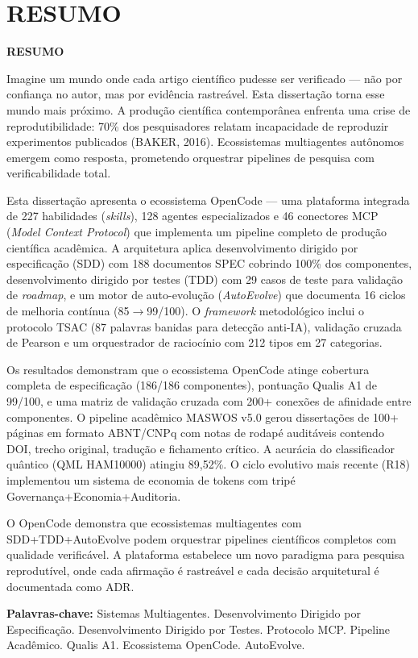\chapter*{RESUMO}
\thispagestyle{empty}

\begin{center}
  {\Large\bfseries RESUMO\par}
\end{center}
\vspace{1cm}

Imagine um mundo onde cada artigo científico pudesse ser verificado — não por confiança no autor, mas por evidência rastreável. Esta dissertação torna esse mundo mais próximo. A produção científica contemporânea enfrenta uma crise de reprodutibilidade: 70\% dos pesquisadores relatam incapacidade de reproduzir experimentos publicados (BAKER, 2016). Ecossistemas multiagentes autônomos emergem como resposta, prometendo orquestrar pipelines de pesquisa com verificabilidade total.

Esta dissertação apresenta o ecossistema OpenCode --- uma plataforma integrada de 227 habilidades (\textit{skills}), 128 agentes especializados e 46 conectores MCP (\textit{Model Context Protocol}) que implementa um pipeline completo de produção científica acadêmica. A arquitetura aplica desenvolvimento dirigido por especificação (SDD) com 188 documentos SPEC cobrindo 100\% dos componentes, desenvolvimento dirigido por testes (TDD) com 29 casos de teste para validação de \textit{roadmap}, e um motor de auto-evolução (\textit{AutoEvolve}) que documenta 16 ciclos de melhoria contínua (85$\rightarrow$99/100). O \textit{framework} metodológico inclui o protocolo TSAC (87 palavras banidas para detecção anti-IA), validação cruzada de Pearson e um orquestrador de raciocínio com 212 tipos em 27 categorias.

Os resultados demonstram que o ecossistema OpenCode atinge cobertura completa de especificação (186/186 componentes), pontuação Qualis A1 de 99/100, e uma matriz de validação cruzada com 200+ conexões de afinidade entre componentes. O pipeline acadêmico MASWOS v5.0 gerou dissertações de 100+ páginas em formato ABNT/CNPq com notas de rodapé auditáveis contendo DOI, trecho original, tradução e fichamento crítico. A acurácia do classificador quântico (QML HAM10000) atingiu 89,52\%. O ciclo evolutivo mais recente (R18) implementou um sistema de economia de tokens com tripé Governança+Economia+Auditoria.

O OpenCode demonstra que ecossistemas multiagentes com SDD+\-TDD+\-Auto\-Evolve podem orquestrar pipelines científicos completos com qualidade verificável. A plataforma estabelece um novo paradigma para pesquisa reprodutível, onde cada afirmação é rastreável e cada decisão arquitetural é documentada como ADR.

\vspace{1cm}
\noindent\textbf{Palavras-chave:} Sistemas Multiagentes. Desenvolvimento Dirigido por Especificação. Desenvolvimento Dirigido por Testes. Protocolo MCP. Pipeline Acadêmico. Qualis A1. Ecossistema OpenCode. AutoEvolve.
\newpage
